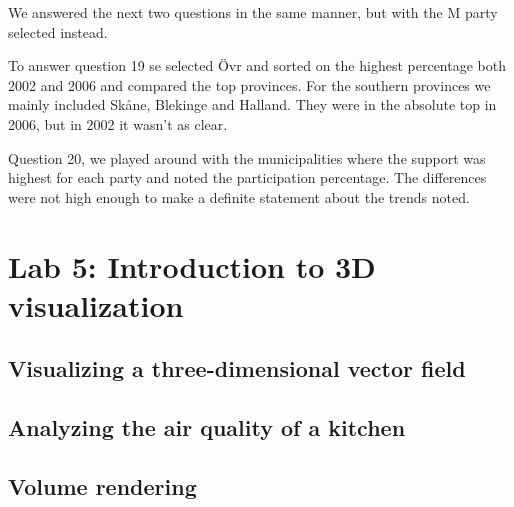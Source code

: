 \documentclass[a4paper]{article}
\begin{document}
We answered the next two questions in the same manner, but with the M party selected instead.

To answer question 19 se selected \"Ovr and sorted on the highest percentage both 2002 and 2006 and compared the top provinces. For the southern provinces we mainly included Sk\aa ne, Blekinge and Halland. They were in the absolute top in 2006, but in 2002 it wasn't as clear. 

Question 20, we played around with the municipalities where the support was highest for each party and noted the participation percentage. The differences were not high enough to make a definite statement about the trends noted.
\newpage
\section{Lab 5: Introduction to 3D visualization}

\subsection{Visualizing a three-dimensional vector field}

\subsection{Analyzing the air quality of a kitchen}

\subsection{Volume rendering}
\end{document}
